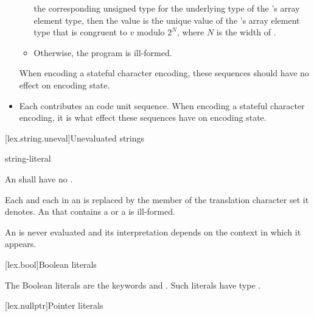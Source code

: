 \begin{itemize}
\begin{itemize}
the corresponding unsigned type for the underlying type of
the 's array element type,
then the value is the unique value of
the 's array element type 
that is congruent to $v$ modulo $2^N$, where $N$ is the width of .
\item
Otherwise, the program is ill-formed.
\end{itemize}
When encoding a stateful character encoding,
these sequences should have no effect on encoding state.
\item
Each 
contributes an
code unit sequence.
When encoding a stateful character encoding,
it is
what effect these sequences have on encoding state.
\end{itemize}

[lex.string.uneval]{Unevaluated strings}

\begin{bnf}
\br
    string-literal
\end{bnf}

\pnum
An  shall have no .

\pnum
Each  and each  in an  is
replaced by the member of the translation character set it denotes.
An  that contains
a  or
a 
is ill-formed.

\pnum
An  is never evaluated and
its interpretation depends on the context in which it appears.

[lex.bool]{Boolean literals}

%
\begin{bnf}
\br
    \br
\end{bnf}

\pnum
{}%
The Boolean literals are the keywords  and .
Such literals have type .

[lex.nullptr]{Pointer literals}

%
\begin{bnf}
\br
\end{bnf}


